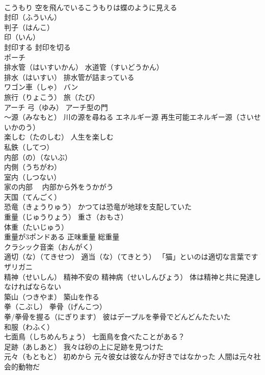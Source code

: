 \documentclass[8pt]{extreport}
\begin{document}
\begin{CJK}{UTF8}{min}
\\	こうもり 空を飛んでいるこうもりは蝶のように見える
\\	封印（ふういん） 
\\	判子（はんこ） 
\\	印（いん） 
\\	封印する 封印を切る
\\	ポーチ
\\	排水管（はいすいかん） 水道管（すいどうかん）
\\	排水（はいすい） 排水管が詰まっている
\\	ワゴン車（しゃ） バン
\\	旅行（りょこう） 旅（たび）
\\	アーチ 弓（ゆみ） アーチ型の門
\\	～源（みなもと） 川の源を尋ねる エネルギー源 再生可能エネルギー源（さいせいかのう）
\\	楽しむ（たのしむ） 人生を楽しむ
\\	私鉄（してつ）
\\	内部（の）（ないぶ）
\\	内側（うちがわ）
\\	室内（しつない）
\\	家の内部　 内部から外をうかがう
\\	天国（てんごく）
\\	恐竜（きょうりゅう） かつては恐竜が地球を支配していた
\\	重量（じゅうりょう） 重さ（おもさ）
\\	体重（たいじゅう）
\\	重量が3ポンドある 正味重量 総重量
\\	クラシック音楽（おんがく）
\\	適切（な）（てきせつ） 適当（な）（てきとう） 「猫」といのは適切な言葉です
\\	ザリガニ
\\	精神（せいしん） 精神不安の 精神病（せいしんびょう） 体は精神と共に発達しなければならない
\\	築山（つきやま） 築山を作る
\\	拳（こぶし） 拳骨（げんこつ）
\\	拳/拳骨を握る（にぎります） 彼はデープルを拳骨でどんどんたたいた
\\	和服（わふく）
\\	七面鳥（しちめんちょう） 七面鳥を食べたことがある？
\\	足跡（あしあと） 我々は砂の上に足跡を見つけた
\\	元々（もともと） 初めから 元々彼女は彼なんか好きではなかった 人間は元々社会的動物だ

\end{CJK}
\end{document}
